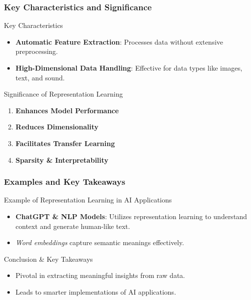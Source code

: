 \documentclass[aspectratio=169]{beamer}
\begin{document}
\begin{frame}[fragile]
    \frametitle{Key Characteristics and Significance}

    \begin{block}{Key Characteristics}
        \begin{itemize}
            \item \textbf{Automatic Feature Extraction}: Processes data without extensive preprocessing.
            \item \textbf{High-Dimensional Data Handling}: Effective for data types like images, text, and sound. 
        \end{itemize}
    \end{block}
    
    \begin{block}{Significance of Representation Learning}
        \begin{enumerate}
            \item \textbf{Enhances Model Performance}
            \item \textbf{Reduces Dimensionality}
            \item \textbf{Facilitates Transfer Learning}
            \item \textbf{Sparsity \& Interpretability}
        \end{enumerate}
    \end{block}
    
\end{frame}

\begin{frame}[fragile]
    \frametitle{Examples and Key Takeaways}

    \begin{block}{Example of Representation Learning in AI Applications}
        \begin{itemize}
            \item \textbf{ChatGPT \& NLP Models}: Utilizes representation learning to understand context and generate human-like text.
            \item \textit{Word embeddings} capture semantic meanings effectively.
        \end{itemize}
    \end{block}
    
    \begin{block}{Conclusion \& Key Takeaways}
        \begin{itemize}
            \item Pivotal in extracting meaningful insights from raw data.
            \item Leads to smarter implementations of AI applications.
        \end{itemize}
    \end{block}

\end{frame}
\end{document}
